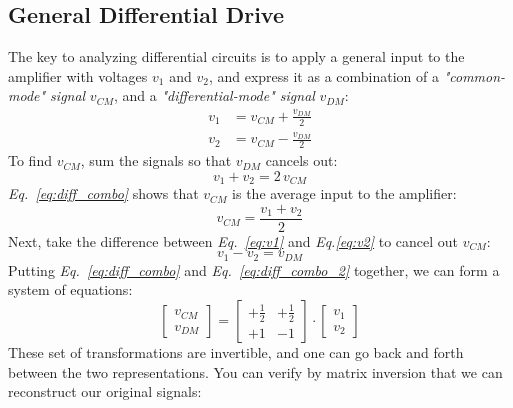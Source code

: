 \subsection{General Differential Drive}
The key to analyzing differential circuits is to apply a general input to the amplifier with voltages $v_1$ and $v_2$, and express it as a combination of a \textit{"common-mode" signal} $v_{CM}$, and a \textit{"differential-mode" signal} $v_{DM}$:
    \begin{align}
        v_1 &= v_{CM} + \frac{v_{DM}}{2}
        \label{eq:v1}\\[0.15cm]
        v_2 &= v_{CM} - \frac{v_{DM}}{2}
        \label{eq:v2}
    \end{align}
To find $v_{CM}$, sum the signals so that $v_{DM}$ cancels out:
    \begin{equation}
        v_1 + v_2 = 2\,v_{CM}
        \label{eq:diff_combo}
    \end{equation}
\emph{Eq.~\ref{eq:diff_combo}} shows that $v_{CM}$ is the average input to the amplifier:
    \begin{equation}
        v_{CM} = \frac{v_1 + v_2}{2}
    \end{equation}
Next, take the difference between \emph{Eq.~\ref{eq:v1}} and \emph{Eq.\ref{eq:v2}} to cancel out $v_{CM}$:
    \begin{equation}
        v_1 - v_2 = v_{DM} 
        \label{eq:diff_combo_2}
    \end{equation}
Putting \emph{Eq.~\ref{eq:diff_combo}} and \emph{Eq.~\ref{eq:diff_combo_2}} together, we can form a system of equations:
    \begin{equation}
    	\left[\begin{matrix}
    		v_{CM}\\[0.1cm]
    		v_{DM}
    	\end{matrix}\right]
    	=
    	\left[\begin{matrix}
    		+\frac{1}{2} & +\frac{1}{2}\\[0.1cm]
    		+1 & -1
    	\end{matrix}\right]
    	\cdot
    	\left[\begin{matrix}
    		v_{1}\\[0.1cm]
    		v_{2}
    	\end{matrix}\right]
    \end{equation}  
These set of transformations are invertible, and one can go back and forth between the two representations.  You can verify by matrix inversion that we can reconstruct our original signals:
